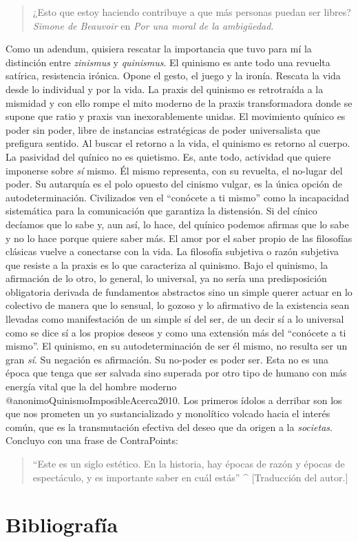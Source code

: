 \documentclass[
]{article}
\begin{document}
\begin{quote}
¿Esto que estoy haciendo contribuye a que más personas puedan ser
libres? \emph{Simone de Beauvoir} en \emph{Por una moral de la
ambigüedad}.
\end{quote}

Como un adendum, quisiera rescatar la importancia que tuvo para mí la
distinción entre \emph{zinismus} y \emph{quinismus}. El quinismo es ante
todo una revuelta satírica, resistencia irónica. Opone el gesto, el
juego y la ironía. Rescata la vida desde lo individual y por la vida. La
praxis del quinismo es retrotraída a la mismidad y con ello rompe el
mito moderno de la praxis transformadora donde se supone que ratio y
praxis van inexorablemente unidas. El movimiento quínico es poder sin
poder, libre de instancias estratégicas de poder universalista que
prefigura sentido. Al buscar el retorno a la vida, el quinismo es
retorno al cuerpo. La pasividad del quínico no es quietismo. Es, ante
todo, actividad que quiere imponerse sobre \emph{sí} mismo. Él mismo
representa, con su revuelta, el no-lugar del poder. Su autarquía es el
polo opuesto del cinismo vulgar, es la única opción de
autodeterminación. Civilizados ven el ``conócete a ti mismo'' como la
incapacidad sistemática para la comunicación que garantiza la
distensión. Si del cínico decíamos que lo sabe y, aun así, lo hace, del
quínico podemos afirmas que lo sabe y no lo hace porque quiere saber
más. El amor por el saber propio de las filosofías clásicas vuelve a
conectarse con la vida. La filosofía subjetiva o razón subjetiva que
resiste a la praxis es lo que caracteriza al quinismo. Bajo el quinismo,
la afirmación de lo otro, lo general, lo universal, ya no sería una
predisposición obligatoria derivada de fundamentos abstractos sino un
simple querer actuar en lo colectivo de manera que lo sensual, lo gozoso
y lo afirmativo de la existencia sean llevadas como manifestación de un
simple sí del ser, de un decir sí a lo universal como se dice sí a los
propios deseos y como una extensión más del ``conócete a ti mismo''. El
quinismo, en su autodeterminación de ser él mismo, no resulta ser un
gran \emph{sí}. Su negación es afirmación. Su no-poder es poder ser.
Esta no es una época que tenga que ser salvada sino superada por otro
tipo de humano con más energía vital que la del hombre moderno
@anonimoQuinismoImposibleAcerca2010. Los primeros ídolos a derribar son
los que nos prometen un yo sustancializado y monolítico volcado hacia el
interés común, que es la transmutación efectiva del deseo que da origen
a la \emph{societas}. Concluyo con una frase de ContraPoints:

\begin{quote}
``Este es un siglo estético. En la historia, hay épocas de razón y
épocas de espectáculo, y es importante saber en cuál estás'' \^{}
{[}Traducción del autor.{]}
\end{quote}

\hypertarget{bibliografuxeda}{%
\section{Bibliografía}\label{bibliografuxeda}}
\end{document}
